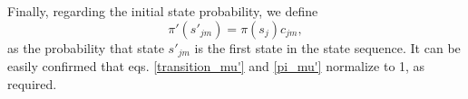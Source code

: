 \documentclass[extendedabs]{recpad2k}
\begin{document}
Finally, regarding the initial state probability, we define
\begin{equation}
    \pi'(s'_{jm}) = \pi(s_j)c_{jm},
    \label{pi_mu'}
\end{equation}
as the probability that state $s'_{jm}$ is the first state in the state sequence. %
It can be easily confirmed that eqs. \eqref{transition_mu'} and \eqref{pi_mu'} normalize to 1, as required.
\end{document}
